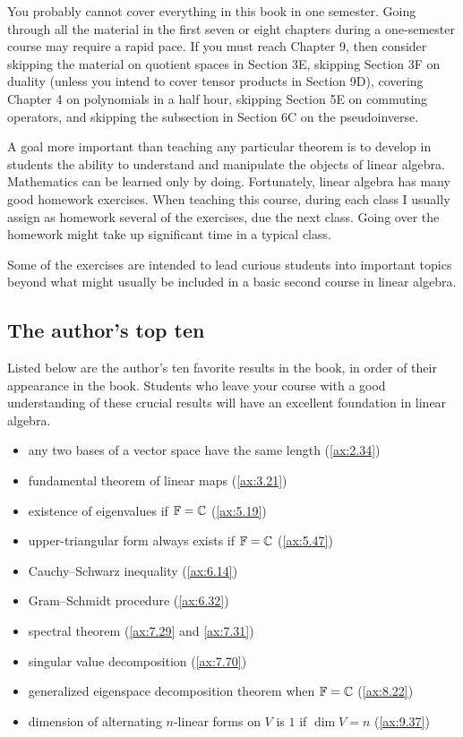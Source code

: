 You probably cannot cover everything in this book in one semester. Going
through all the material in the first seven or eight chapters during a
one-semester course may require a rapid pace. If you must reach Chapter 9, then
consider skipping the material on quotient spaces in Section 3E, skipping
Section 3F on duality (unless you intend to cover tensor products in
Section 9D), covering Chapter 4 on polynomials in a half hour, skipping
Section 5E on commuting operators, and skipping the subsection in Section 6C on
the pseudoinverse.

A goal more important than teaching any particular theorem is to develop in
students the ability to understand and manipulate the objects of linear
algebra. Mathematics can be learned only by doing. Fortunately, linear algebra
has many good homework exercises. When teaching this course, during each class
I usually assign as homework several of the exercises, due the next class.
Going over the homework might take up significant time in a typical class.

Some of the exercises are intended to lead curious students into important
topics beyond what might usually be included in a basic second course in
linear algebra.

\subsection*{The author's top ten}

Listed below are the author's ten favorite results in the book, in order of
their appearance in the book. Students who leave your course with a good
understanding of these crucial results will have an excellent foundation in
linear algebra.
\begin{itemize}
\item any two bases of a vector space have the same length (\ref{ax:2.34})
\item fundamental theorem of linear maps (\ref{ax:3.21})
\item existence of eigenvalues if $\mathbb{F}=\mathbb{C}$ (\ref{ax:5.19})
\item upper-triangular form always exists if $\mathbb{F}=\mathbb{C}$ (\ref{ax:5.47})
\item Cauchy--Schwarz inequality (\ref{ax:6.14})
\item Gram--Schmidt procedure (\ref{ax:6.32})
\item spectral theorem (\ref{ax:7.29} and \ref{ax:7.31})
\item singular value decomposition (\ref{ax:7.70})
\item generalized eigenspace decomposition theorem when $\mathbb{F}=\mathbb{C}$
  (\ref{ax:8.22})
\item dimension of alternating $n$-linear forms on $V$ is $1$ if $\dim V=n$
  (\ref{ax:9.37})
\end{itemize}

